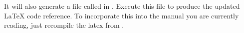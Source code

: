 \documentclass[11pt]{report}
\begin{document}
\begin{appendices}
It will also generate a file called  in . Execute this file to produce the updated \LaTeX{} code reference. To incorporate this into the manual you are currently reading, just recompile the latex from . 




\end{appendices}
\end{document}
